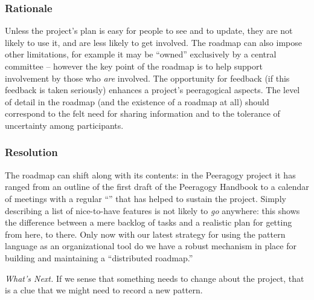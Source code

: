 \subsubsection*{Rationale} Unless the project's plan is easy for people to see and to update, they are not likely to use it, and are less likely to get involved.  The roadmap can also impose other limitations, for example it may be ``owned'' exclusively by a central committee -- however the key point of the roadmap is to help support involvement by those who \emph{are} involved.  The opportunity for feedback (if this feedback is taken seriously) enhances a project's peeragogical aspects.  The level of detail in the roadmap (and the existence of a roadmap at all) should correspond to the felt need for sharing information and to the tolerance of uncertainty among participants.

\subsubsection*{Resolution}
The roadmap can shift along with its contents: in the Peeragogy project it has ranged from an outline of the first draft of the Peeragogy Handbook to a calendar of meetings with a regular ``'' that has helped to sustain the project. Simply describing a list of nice-to-have features is not likely to \emph{go} anywhere: this shows the difference between a mere backlog of tasks and a realistic plan for getting from here, to there.  Only now with our latest strategy for using the pattern language as an organizational tool do we have a robust mechanism in place for building and maintaining a ``distributed roadmap.''

\begin{framed}
\emph{What's Next.}
If we sense that something needs to change about the project, that is a clue that we might need to record a new pattern.
\end{framed}

\endgroup
    
    
    
